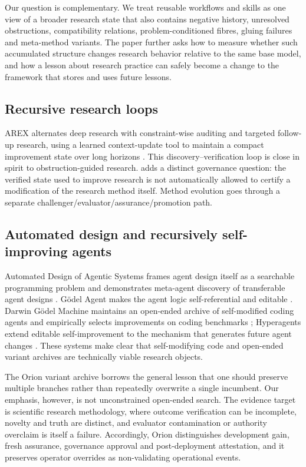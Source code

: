 Our question is complementary. We treat reusable workflows and skills as one view of a broader research state that also contains negative history, unresolved obstructions, compatibility relations, problem-conditioned fibres, gluing failures and meta-method variants. The paper further asks how to measure whether such accumulated structure changes research behavior relative to the same base model, and how a lesson about research practice can safely become a change to the framework that stores and uses future lessons.

\subsection{Recursive research loops}

AREX alternates deep research with constraint-wise auditing and targeted follow-up research, using a learned context-update tool to maintain a compact improvement state over long horizons \cite{lu2026arex}. This discovery--verification loop is close in spirit to obstruction-guided research. \RAKL{} adds a distinct governance question: the verified state used to improve research is not automatically allowed to certify a modification of the research method itself. Method evolution goes through a separate challenger/evaluator/assurance/promotion path.

\subsection{Automated design and recursively self-improving agents}

Automated Design of Agentic Systems frames agent design itself as a searchable programming problem and demonstrates meta-agent discovery of transferable agent designs \cite{hu2024adas}. G\"odel Agent makes the agent logic self-referential and editable \cite{yin2024godelagent}. Darwin G\"odel Machine maintains an open-ended archive of self-modified coding agents and empirically selects improvements on coding benchmarks \cite{zhang2025dgm}; Hyperagents extend editable self-improvement to the mechanism that generates future agent changes \cite{zhang2026hyperagents}. These systems make clear that self-modifying code and open-ended variant archives are technically viable research objects.

The Orion variant archive borrows the general lesson that one should preserve multiple branches rather than repeatedly overwrite a single incumbent. Our emphasis, however, is not unconstrained open-ended search. The evidence target is scientific research methodology, where outcome verification can be incomplete, novelty and truth are distinct, and evaluator contamination or authority overclaim is itself a failure. Accordingly, Orion distinguishes development gain, fresh assurance, governance approval and post-deployment attestation, and it preserves operator overrides as non-validating operational events.

